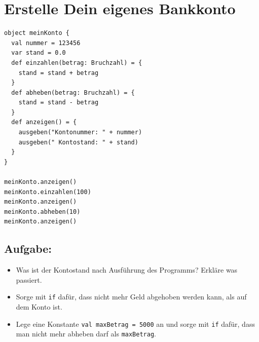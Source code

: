 \chapter{Erstelle Dein eigenes Bankkonto}
\begin{multicols}{2}

\begin{lstlisting}[basicstyle={\ttfamily\fontsize{16}{19}\selectfont},numbers=none]
object meinKonto {
  val nummer = 123456
  var stand = 0.0
  def einzahlen(betrag: Bruchzahl) = {
    stand = stand + betrag
  }
  def abheben(betrag: Bruchzahl) = {
    stand = stand - betrag
  }
  def anzeigen() = {
    ausgeben("Kontonummer: " + nummer)
    ausgeben(" Kontostand: " + stand)
  }
}

meinKonto.anzeigen()
meinKonto.einzahlen(100)
meinKonto.anzeigen()
meinKonto.abheben(10)
meinKonto.anzeigen()
\end{lstlisting}
        


\columnbreak


\section*{\color{BrickRed}Aufgabe:}


\begin{itemize}

\item {Was ist der Kontostand nach Ausführung des Programms? Erkläre was passiert.}
\item {Sorge mit \lstinline{if} dafür, dass nicht mehr Geld abgehoben werden kann, als auf dem Konto ist.}
\item {Lege eine Konstante \lstinline{val maxBetrag = 5000} an und sorge mit \lstinline{if} dafür, dass man nicht mehr abheben darf als \lstinline{maxBetrag}.}

\end{itemize}


\end{multicols}

